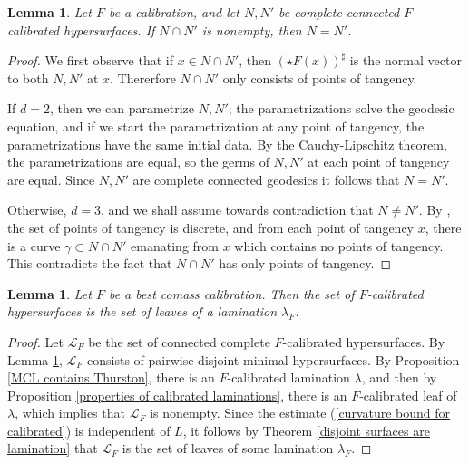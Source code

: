 \documentclass[reqno,11pt]{amsart}
\newtheorem{lemma}[theorem]{Lemma}
\theoremstyle{definition}
\numberwithin{equation}{section}
\begin{document}
\begin{lemma}\label{calibrated implies disjoint}
Let $F$ be a calibration, and let $N, N'$ be complete connected $F$-calibrated hypersurfaces.
If $N \cap N'$ is nonempty, then $N = N'$.
\end{lemma}
\begin{proof}
We first observe that if $x \in N \cap N'$, then $(\star F(x))^\sharp$ is the normal vector to both $N, N'$ at $x$.
Thererfore $N \cap N'$ only consists of points of tangency.

If $d = 2$, then we can parametrize $N, N'$; the parametrizations solve the geodesic equation, and if we start the parametrization at any point of tangency, the parametrizations have the same initial data.
By the Cauchy-Lipschitz theorem, the parametrizations are equal, so the germs of $N, N'$ at each point of tangency are equal.
Since $N, N'$ are complete connected geodesics it follows that $N = N'$.

Otherwise, $d = 3$, and we shall assume towards contradiction that $N \neq N'$.
By \cite[Theorem 7.3]{colding2011course}, the set of points of tangency is discrete, and from each point of tangency $x$, there is a curve $\gamma \subset N \cap N'$ emanating from $x$ which contains no points of tangency.
This contradicts the fact that $N \cap N'$ has only points of tangency.
\end{proof}

\begin{lemma}\label{existence of semicanonical lamination}
Let $F$ be a best comass calibration.
Then the set of $F$-calibrated hypersurfaces is the set of leaves of a lamination $\lambda_F$.
\end{lemma}
\begin{proof}
Let $\mathscr L_F$ be the set of connected complete $F$-calibrated hypersurfaces.
By Lemma \ref{calibrated implies disjoint}, $\mathscr L_F$ consists of pairwise disjoint minimal hypersurfaces.
By Proposition \ref{MCL contains Thurston}, there is an $F$-calibrated lamination $\lambda$, and then by Proposition \ref{properties of calibrated laminations}, there is an $F$-calibrated leaf of $\lambda$, which implies that $\mathscr L_F$ is nonempty.
Since the estimate (\ref{curvature bound for calibrated}) is independent of $L$, it follows by Theorem \ref{disjoint surfaces are lamination} that $\mathscr L_F$ is the set of leaves of some lamination $\lambda_F$.
\end{proof}
\end{document}
